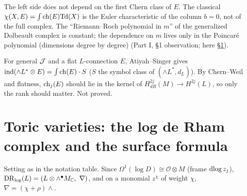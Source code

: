 \begin{rem}[Meaning\ \tP]
The left side does not depend on the first Chern class of $E$. The classical $\chi(X,E)=\int\mathrm{ch}(E)\mathrm{Td}(X)$ is the Euler characteristic of the column $b=0$, not of the full complex. The ``Riemann--Roch polynomial in $m$'' of the generalized Dolbeault complex is constant; the dependence on $m$ lives only in the Poincar\'e polynomial (dimensions degree by degree) (Part I, \S1 observation; here \S\ref{sec:toric}).
\end{rem}
\begin{rem}
For general $\mathcal J$ and a flat $L$-connection $E$, Atiyah--Singer gives $\mathrm{ind}(\wedge L^*\otimes E)=\int\mathrm{ch}(E)\cdot S$ ($S$ the symbol class of $(\wedge L^*,d_L)$). By Chern--Weil and flatness, $\mathrm{ch}_j(E)$ should lie in the kernel of $H^{2j}_{dR}(M)\to H^{2j}(L)$, so only the rank should matter. Not proved.
\end{rem}

\section{Toric varieties: the log de Rham complex and the surface formula}\label{sec:toric}
Setting as in the notation table. Since $\Omega^1(\log D)\cong\mathcal O\otimes M$ (frame $\mathrm{dlog}\, z_j$), $\mathrm{DR}_{\log}(L)=(L\otimes\wedge^\bullet M_\mathbb C,\ \nabla)$, and on a monomial $z^\chi$ of weight $\chi$, $\nabla=(\chi+\rho)\wedge$.

